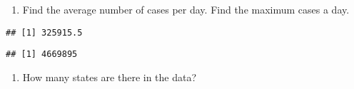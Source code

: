 \documentclass[
]{article}
\newenvironment{Shaded}{\begin{snugshade}}{\end{snugshade}}
\newcommand{\AttributeTok}[1]{\textcolor[rgb]{0.77,0.63,0.00}{#1}}
\newcommand{\ConstantTok}[1]{\textcolor[rgb]{0.00,0.00,0.00}{#1}}
\newcommand{\FunctionTok}[1]{\textcolor[rgb]{0.00,0.00,0.00}{#1}}
\newcommand{\NormalTok}[1]{#1}
\newcommand{\SpecialCharTok}[1]{\textcolor[rgb]{0.00,0.00,0.00}{#1}}
\providecommand{\tightlist}{%
  \setlength{\itemsep}{0pt}\setlength{\parskip}{0pt}}
\begin{document}
\begin{enumerate}
\def\labelenumi{\arabic{enumi}.}
\setcounter{enumi}{6}
\tightlist
\item
  Find the average number of cases per day. Find the maximum cases a
  day.
\end{enumerate}

\begin{Shaded}
\end{Shaded}

\begin{verbatim}
## [1] 325915.5
\end{verbatim}

\begin{Shaded}
\end{Shaded}

\begin{verbatim}
## [1] 4669895
\end{verbatim}

\begin{enumerate}
\def\labelenumi{\arabic{enumi}.}
\setcounter{enumi}{7}
\tightlist
\item
  How many states are there in the data?
\end{enumerate}

\begin{Shaded}
\end{Shaded}
\end{document}
